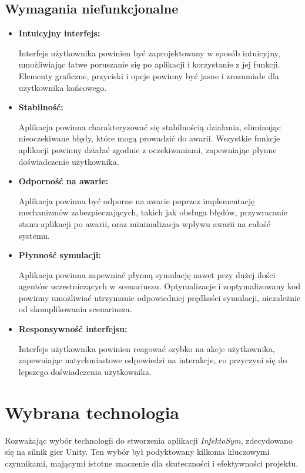 \subsection{\textbf{Wymagania niefunkcjonalne}}
\begin{itemize}
	\item\textbf{  Intuicyjny interfejs:}
	
	Interfejs użytkownika powinien być zaprojektowany w sposób intuicyjny, umożliwiając łatwe poruszanie się po aplikacji i korzystanie z jej funkcji. Elementy graficzne, przyciski i opcje powinny być jasne i zrozumiałe dla użytkownika końcowego.
	\item\textbf{ Stabilność:}
	
	Aplikacja powinna charakteryzować się stabilnością działania, eliminując nieoczekiwane błędy, które mogą prowadzić do awarii. Wszystkie funkcje aplikacji powinny działać zgodnie z oczekiwaniami, zapewniając płynne doświadczenie użytkownika.
	\item\textbf{ Odporność na awarie:}
	
	Aplikacja powinna być odporne na awarie poprzez implementację mechanizmów zabezpieczających, takich jak obsługa błędów, przywracanie stanu aplikacji po awarii, oraz minimalizacja wpływu awarii na całość systemu.
	
	\item \textbf{Płynność symulacji:}
	
	Aplikacja powinna zapewniać płynną symulację nawet przy dużej ilości agentów uczestniczących w scenariuszu. Optymalizacje i zoptymalizowany kod powinny umożliwiać utrzymanie odpowiedniej prędkości symulacji, niezależnie od skomplikowania scenariusza.
	
	\item\textbf{ Responsywność interfejsu:}
	
	Interfejs użytkownika powinien reagować szybko na akcje użytkownika, zapewniając natychmiastowe odpowiedzi na interakcje, co przyczyni się do lepszego doświadczenia użytkownika.
\end{itemize}
\section{\textbf{Wybrana technologia}}

Rozważając wybór technologii do stworzenia aplikacji \textit{InfektoSym}, zdecydowano się na silnik gier Unity. Ten wybór był podyktowany kilkoma kluczowymi czynnikami, mającymi istotne znaczenie dla skuteczności i efektywności projektu.


